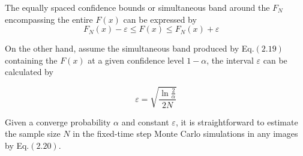 The equally spaced confidence bounds or simultaneous band around the
$F_{N}$ encompassing the entire $F(x)$ can be expressed by
\begin{equation}
  F_{N}(x) - \varepsilon \leq F(x) \leq F_N(x) + \varepsilon \; \; \; \; 
\end{equation}

On the other hand, assume the simultaneous band produced by Eq.$(2.19)$
containing the $F(x)$ at a given confidence level $1-\alpha$, the
interval $\varepsilon$ can be calculated by

\begin{equation}
  \varepsilon = \sqrt{\frac{\ln{\frac{2}{\alpha}}}{2N}}
\end{equation}


Given a converge probability $\alpha$ and constant $\varepsilon$, it is
straightforward to estimate the sample size $N$ in the fixed-time step
Monte Carlo simulations in any images by Eq.$(2.20)$.

